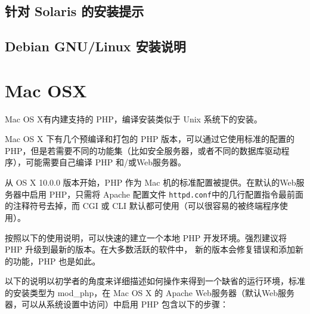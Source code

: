 \subsection{针对 Solaris 的安装提示}


\subsection{Debian GNU/Linux 安装说明}





\section{Mac OSX}

Mac OS X有内建支持的 PHP，编译安装类似于 Unix 系统下的安装。

Mac OS X 下有几个预编译和打包的 PHP 版本，可以通过它使用标准的配置的 PHP，但是若需要不同的功能集（比如安全服务器，或者不同的数据库驱动程序），可能需要自己编译 PHP 和/或Web服务器。

从 OS X 10.0.0 版本开始，PHP 作为 Mac 机的标准配置被提供。在默认的Web服务器中启用 PHP，只需将 Apache 配置文件 \texttt{httpd.conf}中的几行配置指令最前面的注释符号去掉，而 CGI 或 CLI 默认都可使用（可以很容易的被终端程序使用）。

按照以下的使用说明，可以快速的建立一个本地 PHP 开发环境。强烈建议将 PHP 升级到最新的版本。在大多数活跃的软件中， 新的版本会修复错误和添加新的功能，PHP 也是如此。

以下的说明以初学者的角度来详细描述如何操作来得到一个缺省的运行环境，标准的安装类型为 mod\_php，在 Mac OS X 的 Apache Web服务器（默认Web服务器，可以从系统设置中访问）中启用 PHP 包含以下的步骤：

